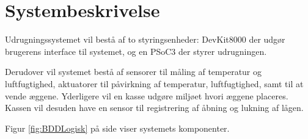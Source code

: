 \chapter{Systembeskrivelse}

Udrugningssystemet vil bestå af to styringsenheder: DevKit8000 der udgør brugerens interface til systemet, og en PSoC3 der styrer udrugningen.

Derudover vil systemet bestå af sensorer til måling af temperatur og luftfugtighed, aktuatorer til påvirkning af temperatur, luftfugtighed, samt til at vende æggene. Yderligere vil en kasse udgøre miljøet hvori æggene placeres. Kassen vil desuden have en sensor til registrering af åbning og lukning af lågen.

Figur \ref{fig:BDDLogisk} på side \pageref{fig:BDDLogisk} viser systemets komponenter.



